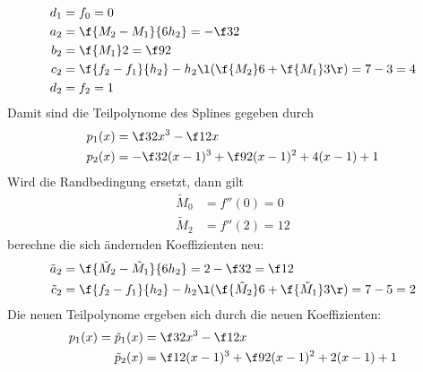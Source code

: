 \documentclass[a4paper]{scrartcl}
\begin{document}
\begin{aufgabe}
\begin{enumerate}[a)]
\begin{align*}
				d_1 &= f_0 = 0 \\
				a_2 &= \f {M_2-M_1}{6h_2} = -\f 32 \\
				b_2 &= \f {M_1}2 = \f 92 \\
				c_2 &= \f {f_2 - f_1}{h_2} - h_2\l(\f {M_2}6 + \f {M_1}3\r) = 7 - 3 = 4 \\
				d_2 &= f_2 = 1
			\end{align*}
			Damit sind die Teilpolynome des Splines gegeben durch
			\begin{align*}
				p_1(x) &= \f 32 x^3 - \f 12 x \\
				p_2(x) &= -\f 32 (x-1)^3 + \f 92 (x-1)^2 + 4(x-1) + 1
			\end{align*}
			Wird die Randbedingung ersetzt, dann gilt
			\begin{align*}
				\tilde M_0 &= f''(0) = 0 \\
				\tilde M_2 &= f''(2) = 12
			\end{align*}
			berechne die sich ändernden Koeffizienten neu:
			\begin{align*}
				\tilde a_2 &= \f {\tilde M_2-\tilde M_1}{6h_2} = 2 - \f 32 =  \f 12 \\
				\tilde c_2 &= \f {f_2 - f_1}{h_2} - h_2\l(\f {\tilde M_2}6 + \f {\tilde M_1}3\r) = 7 - 5 = 2 \\
			\end{align*}
			Die neuen Teilpolynome ergeben sich durch die neuen Koeffizienten:
			\begin{align*}
				p_1(x) = \tilde p_1(x) &= \f 32 x^3 - \f 12 x \\
				\tilde p_2(x) &= \f 12 (x-1)^3 + \f 92 (x-1)^2 + 2(x-1) + 1
			\end{align*}
	\end{enumerate}
\end{aufgabe}
\end{document}
